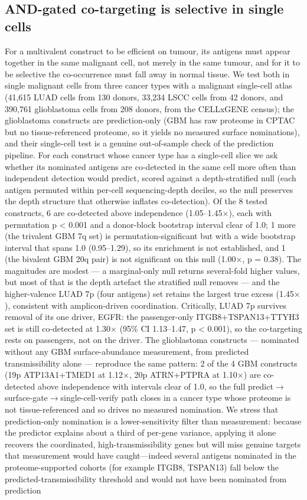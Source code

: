 \documentclass[times, twoside]{zHenriquesLab-StyleBioRxiv}
\begin{document}
\subsection*{AND-gated co-targeting is selective in single cells}
For a multivalent construct to be efficient on tumour, its antigens must appear together in the same malignant cell, not merely in the same tumour, and for it to be selective the co-occurrence must fall away in normal tissue. We test both in single malignant cells from three cancer types with a malignant single-cell atlas (41,615 LUAD cells from 130 donors, 33,234 LSCC cells from 42 donors, and 390,761 glioblastoma cells from 208 donors, from the CELLxGENE census\cite{ref21}); the glioblastoma constructs are prediction-only (GBM has raw proteome in CPTAC but no tissue-referenced proteome, so it yields no measured surface nominations), and their single-cell test is a genuine out-of-sample check of the prediction pipeline. For each construct whose cancer type has a single-cell slice we ask whether its nominated antigens are co-detected in the same cell more often than independent detection would predict, scored against a depth-stratified null (each antigen permuted within per-cell sequencing-depth deciles, so the null preserves the depth structure that otherwise inflates co-detection). Of the 8 tested constructs, 6 are co-detected above independence (1.05--1.45$\times$), each with permutation p < 0.001 and a donor-block bootstrap interval clear of 1.0; 1 more (the trivalent GBM 7q set) is permutation-significant but with a wide bootstrap interval that spans 1.0 (0.95--1.29), so its enrichment is not established, and 1 (the bivalent GBM 20q pair) is not significant on this null (1.00$\times$, p = 0.38). The magnitudes are modest --- a marginal-only null returns several-fold higher values, but most of that is the depth artefact the stratified null removes --- and the higher-valence LUAD 7p (four antigens) set retains the largest true excess (1.45$\times$), consistent with amplicon-driven coordination. Critically, LUAD 7p survives removal of its one driver, EGFR: the passenger-only ITGB8+TSPAN13+TTYH3 set is still co-detected at 1.30$\times$ (95\% CI 1.13--1.47, p < 0.001), so the co-targeting rests on passengers, not on the driver. The glioblastoma constructs --- nominated without any GBM surface-abundance measurement, from predicted transmissibility alone --- reproduce the same pattern: 2 of the 4 GBM constructs (19p ATP13A1+TMED1 at 1.12$\times$, 20p ATRN+PTPRA at 1.10$\times$) are co-detected above independence with intervals clear of 1.0, so the full predict$\rightarrow$surface-gate$\rightarrow$single-cell-verify path closes in a cancer type whose proteome is not tissue-referenced and so drives no measured nomination. We stress that prediction-only nomination is a lower-sensitivity filter than measurement: because the predictor explains about a third of per-gene variance, applying it alone recovers the coordinated, high-transmissibility genes but will miss genuine targets that measurement would have caught---indeed several antigens nominated in the proteome-supported cohorts (for example ITGB8, TSPAN13) fall below the predicted-transmissibility threshold and would not have been nominated from prediction 
\end{document}
